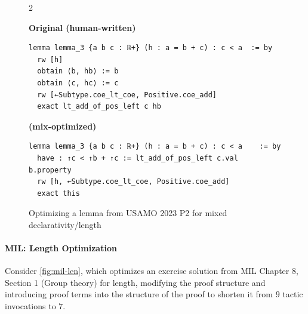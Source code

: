 \setlength{\columnsep}{0.2cm}
\begin{figure}[ht]
\begin{multicols}{2}

{
\textbf{Original (human-written)}
\begin{scriptsize}
\begin{lstlisting}[basicstyle=\scriptsize\ttfamily]
lemma lemma_3 {a b c : ℝ+} (h : a = b + c) : c < a  := by
  rw [h]
  obtain ⟨b, hb⟩ := b
  obtain ⟨c, hc⟩ := c
  rw [←Subtype.coe_lt_coe, Positive.coe_add]
  exact lt_add_of_pos_left c hb
\end{lstlisting}
\end{scriptsize}
}
\vfill\null
\columnbreak
{
\textbf{\methodname{} (mix-optimized)}
\begin{scriptsize}
\begin{lstlisting}[basicstyle=\scriptsize\ttfamily]
lemma lemma_3 {a b c : ℝ+} (h : a = b + c) : c < a    := by
  have : ↑c < ↑b + ↑c := lt_add_of_pos_left c.val b.property
  rw [h, ←Subtype.coe_lt_coe, Positive.coe_add]
  exact this
\end{lstlisting}
\end{scriptsize}
}
\end{multicols}
\vspace{-2.5em}
\caption{Optimizing a lemma from USAMO 2023 P2 for mixed declarativity/length}
\label{fig:compfiles-mix}
\end{figure}

\vspace{15px}
\paragraph{MIL: Length Optimization} 

Consider \autoref{fig:mil-len}, which optimizes an exercise solution from MIL Chapter 8, Section 1 (Group theory) for length, modifying the proof structure and introducing proof terms into the structure of the proof to shorten it from $9$ tactic invocations to $7$.


